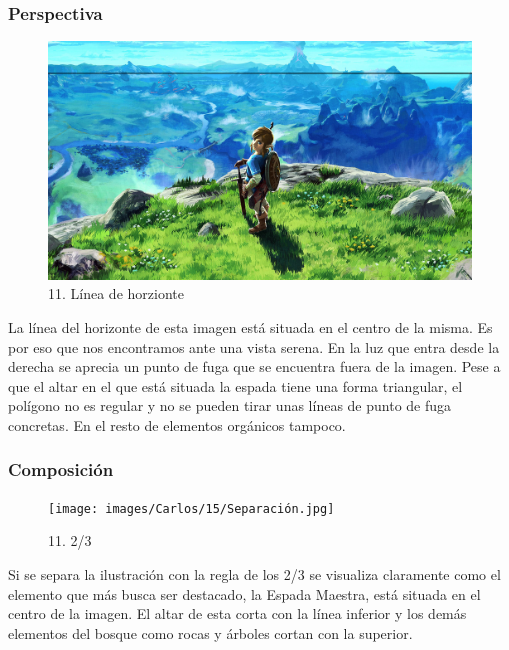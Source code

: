 \documentclass[12pt]{article}
\begin{document}
          \subsubsection{Perspectiva}
          \begin{figure}[H]
      \centering
      \includegraphics[scale=0.35]{images/Carlos/15/Horizonte.jpg}
      \caption{\small 11. Línea de horzionte}
      \end{figure}
      La línea del horizonte de esta imagen está situada en el centro de la misma. Es por eso que nos encontramos ante una vista serena. En la luz que entra desde la derecha se aprecia un punto de fuga que se encuentra fuera de la imagen. Pese a que el altar en el que está situada la espada tiene una forma triangular, el polígono no es regular y no se pueden tirar unas líneas de punto de fuga concretas. En el resto de elementos orgánicos tampoco.
          \subsubsection{Composición}
          \begin{figure}[H]
      \centering
      \texttt{[image: images/Carlos/15/Separación.jpg]}
      \caption{\small 11. 2/3}
      \end{figure}
      Si se separa la ilustración con la regla de los 2/3 se visualiza claramente como el elemento que más busca ser destacado, la Espada Maestra, está situada en el centro de la imagen. El altar de esta corta con la línea inferior y los demás elementos del bosque como rocas y árboles cortan con la superior.
\end{document}

